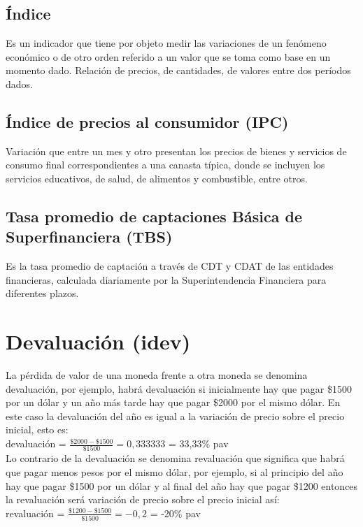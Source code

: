 \subsection{Índice}
Es un indicador que tiene por objeto medir las variaciones de un fenómeno económico o de otro orden referido a un valor que se toma como base en un momento dado. Relación de precios, de cantidades, de valores entre dos períodos dados.

\subsection{Índice de precios al consumidor (IPC)}
Variación que entre un mes y otro presentan los precios de bienes y servicios de consumo final correspondientes a una canasta típica, donde se incluyen los servicios educativos, de salud, de alimentos y combustible, entre otros.

\subsection{Tasa promedio de captaciones Básica de Superfinanciera (TBS)}
Es la tasa promedio de captación a través de CDT y CDAT de las entidades financieras, calculada diariamente por la Superintendencia Financiera para diferentes plazos.	

\section{Devaluación (idev)}	
La pérdida de valor de una moneda frente a otra moneda se denomina devaluación, por ejemplo, habrá devaluación si inicialmente hay que pagar \$1500 por un dólar y un año más tarde hay que pagar \$2000 por el mismo dólar. En este caso la devaluación del año es igual a la variación de precio sobre el precio inicial, esto es: \\

devaluación = $\frac{\$2000-\$1500}{\$1500} = 0,333333 $ = 33,33\% pav \\

Lo contrario de la devaluación se denomina revaluación que significa que habrá que pagar menos pesos por el mismo dólar, por ejemplo, si al principio del año hay que pagar \$1500 por un dólar y al final del año hay que pagar \$1200 entonces la revaluación será variación de precio sobre el precio inicial así: \\

revaluación = $\frac{\$1200-\$1500}{\$1500} = -0,2$ = -20\% pav \\



